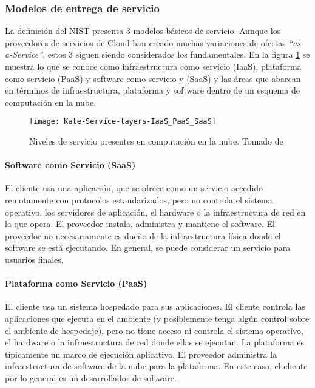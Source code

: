\subsubsection{Modelos de entrega de servicio}

La definición del NIST presenta 3 modelos básicos de servicio. Aunque los proveedores de servicios de Cloud han creado muchas variaciones de ofertas \emph{``as-a-Service''}, estos 3 siguen siendo considerados los fundamentales. En la figura \ref{fig:iaas-vs-paas-vs-saas} se muestra lo que se conoce como infraestructura como servicio (IaaS), plataforma como servicio (PaaS) y software como servicio y (SaaS) y las áreas que abarcan en términos de infraestructura, plataforma y software dentro de un esquema de computación en la nube.

\begin{figure}[h]
  \centering
  \texttt{[image: Kate-Service-layers-IaaS\_PaaS\_SaaS]}
  \caption[Niveles de servicio presentes en computación en la nube]{Niveles de servicio presentes en computación en la nube. Tomado de \protect\cite{kate-craig}}
  \label{fig:iaas-vs-paas-vs-saas}
\end{figure}


\paragraph{Software como Servicio (SaaS)}
El cliente usa una aplicación, que se ofrece como un servicio accedido remotamente con protocolos estandarizados, pero no controla el sistema operativo, los servidores de aplicación, el hardware o la infraestructura de red en la que opera. El proveedor instala, administra y mantiene el software. El proveedor no necesariamente es dueño de la infraestructura física donde el software se está ejecutando. En general, se puede considerar un servicio para usuarios finales.

\paragraph{Plataforma como Servicio (PaaS)}
El cliente usa un sistema hospedado para sus aplicaciones. El cliente controla las aplicaciones que ejecuta en el ambiente (y posiblemente tenga algún control sobre el ambiente de hospedaje), pero no tiene acceso ni controla el sistema operativo, el hardware o la infraestructura de red donde ellas se ejecutan. La plataforma es típicamente un marco de ejecución aplicativo. El proveedor administra la infraestructura de software de la nube para la plataforma. En este caso, el cliente por lo general es un desarrollador de software.

